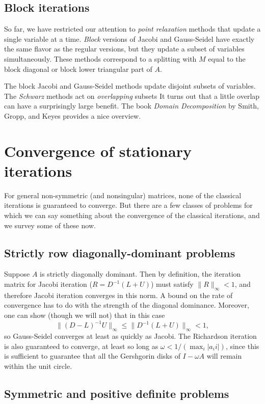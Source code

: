 \documentclass[12pt, leqno]{article} %
\begin{document}
\subsection{Block iterations}

So far, we have restricted our attention to {\em point relaxation} methods
that update a single variable at a time.  {\em Block} versions of Jacobi and
Gauss-Seidel have exactly the same flavor as the regular versions, but they
update a subset of variables simultaneously.  These methods correspond to a
splitting with $M$ equal to the block diagonal or block lower triangular part
of $A$.

The block Jacobi and Gauss-Seidel methods update disjoint subsets of
variables.  The {\em Schwarz} methods act on {\em overlapping} subsets
It turns out that a little overlap can have a surprisingly large benefit.
The book {\em Domain Decomposition} by Smith, Gropp, and Keyes provides a
nice overview.

\section{Convergence of stationary iterations}

For general non-symmetric (and nonsingular) matrices, none of
the classical iterations is guaranteed to converge.
But there are a few classes of problems for which we can say something
about the convergence of the classical iterations, and we survey some
of these now.

\subsection{Strictly row diagonally-dominant problems}

Suppose $A$ is strictly diagonally dominant.  Then by definition,
the iteration matrix for Jacobi iteration ($R = D^{-1} (L+U)$)
must satisfy $\|R\|_\infty < 1$, and therefore Jacobi iteration
converges in this norm.  A bound on the rate of convergence has
to do with the strength of the diagonal dominance.  Moreover,
one can show (though we will not) that in this case
\[
  \|(D-L)^{-1} U\|_\infty \leq \|D^{-1}(L+U)\|_\infty < 1,
\]
so Gauss-Seidel converges at least as quickly as Jacobi.  The
Richardson iteration is also guaranteed to converge, at least so
long as $\omega < 1/(\max_i |a_ii|)$, since this is sufficient to
guarantee that all the Gershgorin disks of $I-\omega A$ will
remain within the unit circle.

\subsection{Symmetric and positive definite problems}
\end{document}

